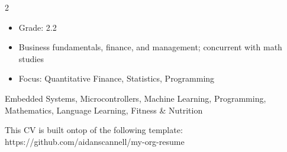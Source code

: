 \documentclass[10pt,a4paper,ragged2e,withhyper]{altacv}
\begin{document}
\begin{paracol}{2}
\begin{itemize}
\item Grade: 2.2
\item Business fundamentals, finance, and management; concurrent with math studies
\end{itemize}
\divider

\begin{itemize}
\item Focus: Quantitative Finance, Statistics, Programming
\end{itemize}
\label{sec:org1f8cfee}

\divider


\divider


\divider


\divider


\bigskip
{}
\label{sec:org570ae7b}

\bigskip
{}
\label{sec:orgab2a46a}

  \nocite{*}
\printbibliography[heading=none,title={}]

\bigskip
{}
\label{sec:org3503436}
Embedded Systems, Microcontrollers, Machine Learning, Programming, Mathematics, Language Learning, Fitness \& Nutrition

\bigskip
\end{paracol}
\vfill
\scriptsize{This CV is built ontop of the following template: https://github.com/aidanscannell/my-org-resume}
\end{document}
